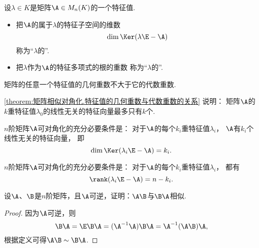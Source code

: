 \begin{definition}
设\(\lambda \in K\)是矩阵\(\A \in M_n(K)\)的一个特征值.
\begin{itemize}
	\item 把\(\A\)的属于\(\lambda\)的特征子空间的维数\[
		\dim\Ker(\lambda\E-\A)
	\]称为“\(\lambda\)的”.
	\item 把\(\lambda\)作为\(\A\)的特征多项式的根的重数
	称为“\(\lambda\)的”.
\end{itemize}
\end{definition}
\begin{theorem}\label{theorem:矩阵相似对角化.特征值的几何重数与代数重数的关系}
矩阵的任意一个特征值的几何重数不大于它的代数重数.
\end{theorem}
\begin{remark}
\cref{theorem:矩阵相似对角化.特征值的几何重数与代数重数的关系} 说明：
矩阵\(\A\)的\(k\)重特征值\(\lambda_0\)的线性无关的特征向量最多只有\(k\)个.
\end{remark}

\begin{theorem}\label{theorem:矩阵可对角化的充分必要条件.定理2}
\(n\)阶矩阵\(\A\)可对角化的充分必要条件是：
对于\(\A\)的每个\(k_i\)重特征值\(\lambda_i\)，
\(\A\)有\(k_i\)个线性无关的特征向量，
即\[
	\dim\Ker(\lambda_i\E-\A) = k_i.
\]
\end{theorem}

\begin{corollary}\label{theorem:矩阵可对角化的充分必要条件.定理3}
\(n\)阶矩阵\(\A\)可对角化的充分必要条件是：
对于\(\A\)的每个\(k_i\)重特征值\(\lambda_i\)，
都有\[
	\rank(\lambda_i\E-\A) = n-k_i.
\]
\end{corollary}

\begin{example}
设\(\A\)、\(\B\)是\(n\)阶矩阵，且\(\A\)可逆，证明：\(\A\B\)与\(\B\A\)相似.
\begin{proof}
因为\(\A\)可逆，则\[
	\B\A
	=\E\B\A
	=(\A^{-1}\A)\B\A
	=\A^{-1}(\A\B)\A,
\]
根据定义可得\(\A\B \sim \B\A\).
\end{proof}
\end{example}

